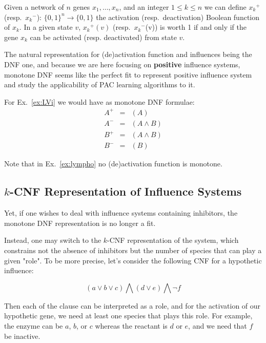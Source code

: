 \documentclass{llncs}
\begin{document}
\begin{definition}
	\label{def:activation}
	Given a network of $n$ genes $x_1,\ldots,x_n$, and
	an integer $1 \leq k \leq n$ we can define ${x_k}^+$ (resp.\ ${x_k}^-$):
	${\{0,1\}}^n \rightarrow\{0,1\}$ the activation (resp.\ deactivation)
	Boolean function of $x_k$. In a given state $v$, ${x_k}^+(v)$ (resp.\ ${x_k}^-$(v)) is worth 1 if and only if the gene $x_k$ can be activated (resp. deactivated) from state $v$.
\end{definition}

The natural representation for (de)activation function and influences being the DNF one, and because we are here focusing on \textbf{positive} influence systems, monotone DNF seems like the perfect fit to represent positive influence system and study the applicability of PAC learning algorithms to it.

\begin{example}

For Ex.~\ref{ex:LVi} we would have as monotone DNF formulae:
\begin{eqnarray*}
   A^+&=&(A)\\
   A^-&=&(A \wedge B)\\
   B^+&=&(A\wedge B)\\
   B^-&=&(B)
\end{eqnarray*}

\end{example}

Note that in Ex.~\ref{ex:lympho} no (de)activation function is monotone.

\subsection{$k$-CNF Representation of Influence Systems}

Yet, if one wishes to deal with influence systems containing inhibitors, the monotone DNF representation is no longer a fit.

Instead, one may switch to the $k$-CNF representation of the system, which constrains not the absence of inhibitors but the number of species that can play a given "role". To be more precise, let's consider the following CNF for a hypothetic influence:

\[
\left(a \vee b \vee c\right) \bigwedge
\left(d \vee e\right) \bigwedge 
\neg f
\]

Then each of the clause can be interpreted as a role, and for the activation of our hypothetic gene, we need at least one species that plays this role. For example, the enzyme can be $a$, $b$, or $c$ whereas 
the reactant is $d$ or $e$, and we need that $f$ be inactive.
\end{document}
